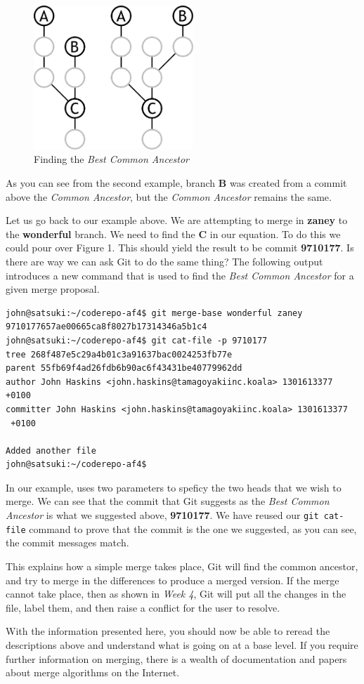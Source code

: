 \begin{figure}[hbt]
\centering
\includegraphics[width=6cm]{images/f-af4-d2.pdf}
\caption{Finding the \emph{Best Common Ancestor}}
\end{figure}

As you can see from the second example, branch \textbf{B} was created from a commit above the \emph{Common Ancestor}, but the \emph{Common Ancestor} remains the same.

Let us go back to our example above.
We are attempting to merge in \textbf{zaney} to the \textbf{wonderful} branch.
We need to find the \textbf{C} in our equation.
To do this we could pour over Figure 1.
This should yield the result to be commit \textbf{9710177}.
Is there are way we can ask Git to do the same thing? The following output introduces a new command that is used to find the \emph{Best Common Ancestor} for a given merge proposal.

\begin{Verbatim}
john@satsuki:~/coderepo-af4$ git merge-base wonderful zaney
9710177657ae00665ca8f8027b17314346a5b1c4
john@satsuki:~/coderepo-af4$ git cat-file -p 9710177
tree 268f487e5c29a4b01c3a91637bac0024253fb77e
parent 55fb69f4ad26fdb6b90ac6f43431be40779962dd
author John Haskins <john.haskins@tamagoyakiinc.koala> 1301613377 +0100
committer John Haskins <john.haskins@tamagoyakiinc.koala> 1301613377
 +0100

Added another file
john@satsuki:~/coderepo-af4$
\end{Verbatim}

In our example,  uses two parameters to speficy the two heads that we wish to merge.
We can see that the commit that Git suggests as the \emph{Best Common Ancestor} is what we suggested above, \textbf{9710177}.
We have reused our \texttt{git cat-file} command to prove that the commit is the one we suggested, as you can see, the commit messages match.

This explains how a simple merge takes place, Git will find the common ancestor, and try to merge in the differences to produce a merged version.
If the merge cannot take place, then as shown in \emph{Week 4}, Git will put all the changes in the file, label them, and then raise a conflict for the user to resolve.

With the information presented here, you should now be able to reread the descriptions above and understand what is going on at a base level.
If you require further information on merging, there is a wealth of documentation and papers about merge algorithms on the Internet.

